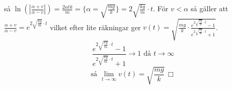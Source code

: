så $\ln(|\frac{\alpha+v}{\alpha-v}|)=\frac{2\alpha tk}{m}=\{\alpha=\sqrt{\frac{mg}{k}}\}=2\sqrt{\frac{kg}{m}}\cdot t$.
För $v<\alpha$ så gäller att $\frac{\alpha+v}{\alpha-v}=e^{2\sqrt{\frac{kg}{m}}\cdot t}$ vilket efter lite räkningar ger $v(t)=\sqrt{\frac{mg}{k}\cdot\frac{e^{2\sqrt{\frac{kg}{m}}\cdot t}-1}{e^{2\sqrt{\frac{kg}{m}}\cdot t}+1}}$.
\begin{equation*}
    \frac{e^{2\sqrt{\frac{kg}{m}}\cdot t}-1}{e^{2\sqrt{\frac{kg}{m}}\cdot t}+1}\to 1\text{ då }t\to\infty
\end{equation*}
\begin{equation*}
    \text{så }\lim_{t\to\infty}v(t)=\sqrt{\frac{mg}{k}}\, \Box
\end{equation*}